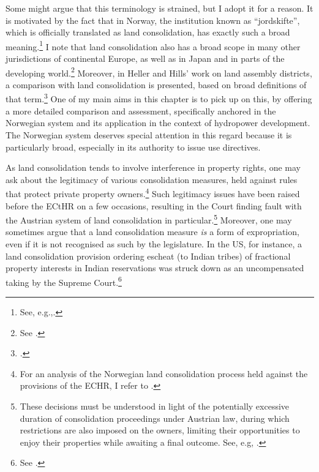 Some might argue that this terminology is strained, but I adopt it for a reason. It is motivated by the fact that in Norway, the institution known as ``jordskifte'', which is officially translated as land consolidation, has exactly such a broad meaning.\footnote{See, e.g.,\cite{reiten09,rognes03}.} I note that land consolidation also has a broad scope in many other jurisdictions of continental Europe, as well as in Japan and in parts of the developing world.\footnote{See \cite{sky07,vitikainen04}.} Moreover, in Heller and Hills' work on land assembly districts, a comparison with land consolidation is presented, based on broad definitions of that term.\footcite{heller08} One of my main aims in this chapter is to pick up on this, by offering a more detailed comparison and assessment, specifically anchored in the Norwegian system and its application in the context of hydropower development. The Norwegian system deserves special attention in this regard because it is particularly broad, especially in its authority to issue use directives.

As land consolidation tends to involve interference in property rights, one may ask about the legitimacy of various consolidation measures, held against rules that protect private property owners.\footnote{For an analysis of the Norwegian land consolidation process held against the provisions of the ECHR, I refer to \cite{utgard09}.} Such legitimacy issues have  been raised before the ECtHR on a few occasions, resulting in the Court finding fault with the Austrian system of land consolidation in particular.\footnote{These decisions must be understood in light of the potentially excessive duration of consolidation proceedings under Austrian law, during which restrictions are also imposed on the owners, limiting their opportunities to enjoy their properties while awaiting a final outcome. See, e.g, \cite{erkner87,poiss87}.} Moreover, one may sometimes argue that a land consolidation measure {\it is} a form of expropriation, even if it is not recognised as such by the legislature. In the US, for instance, a land consolidation provision ordering escheat (to Indian tribes) of fractional property interests in Indian reservations was struck down as an uncompensated taking by the Supreme Court.\footnote{See \cite{hodel87}.}


